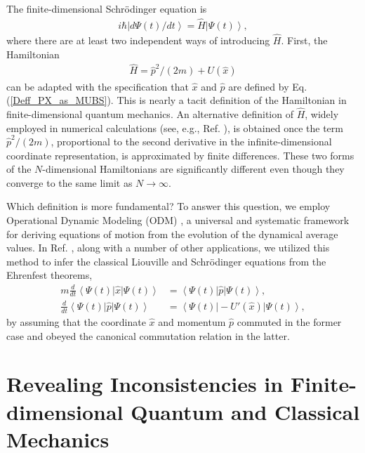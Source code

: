 \documentclass[twocolumn,pra,aps,showpacs,preprintnumbers,nofootinbib, superscriptaddress, amsmath,amssymb]{revtex4}
\newcommand*{\bra}[1]{\left\langle{#1}\right|}
\newcommand*{\ket}[1]{\left| #1 \right\rangle}
\begin{document}
The finite-dimensional Schr\"{o}dinger equation is
\begin{align}\label{Sch_Eq_General_Form}
	i\hbar \ket{d\Psi(t)/dt} = \hat{H} \ket{\Psi(t)},
\end{align}
where there are at least two independent ways of introducing $\hat{H}$. First, the Hamiltonian   
\begin{align}\label{Infinite_Dim_Form_Hamiltonian}
	\hat{H} = \hat{p}^2/(2m) + U(\hat{x})
\end{align}
can be adapted with the specification that $\hat{x}$ and $\hat{p}$ are defined by Eq. (\ref{Deff_PX_as_MUBS}). This is nearly a tacit definition of the Hamiltonian in finite-dimensional quantum mechanics. An alternative definition of $\hat{H}$,  widely employed in numerical calculations (see, e.g., Ref. \cite{Kimball1934}), is obtained once the term $\hat{p}^2/(2m)$,   proportional to the second derivative in the infinite-dimensional coordinate representation, is approximated by finite differences. These two forms of the $N$-dimensional Hamiltonians are significantly different even though they converge to the same limit as $N \to \infty$.

Which definition is more fundamental? To answer this question, we employ Operational Dynamic Modeling (ODM) \cite{Bondar2011c}, a universal and systematic framework for deriving equations of motion from the evolution of the dynamical average values. In Ref. \cite{Bondar2011c}, along with a number of other applications, we utilized this method to infer the classical Liouville and Schr\"{o}dinger equations from the Ehrenfest theorems, 
\begin{align}
	m\frac{d}{dt} \bra{\Psi(t)} \hat{x} \ket{\Psi(t)} & = \bra{\Psi(t)} \hat{p} \ket{\Psi(t)}, 	\label{EhrenfestTh1} \\
	\frac{d}{dt} \bra{\Psi(t)} \hat{p} \ket{\Psi(t)} & = \bra{\Psi(t)} -U'(\hat{x}) \ket{\Psi(t)},	\label{EhrenfestTh2}
\end{align}
by assuming that the coordinate $\hat{x}$ and momentum $\hat{p}$ commuted in the former case and obeyed the canonical commutation relation in the latter.  

\section{Revealing Inconsistencies in Finite-dimensional Quantum and Classical Mechanics}
\end{document}
